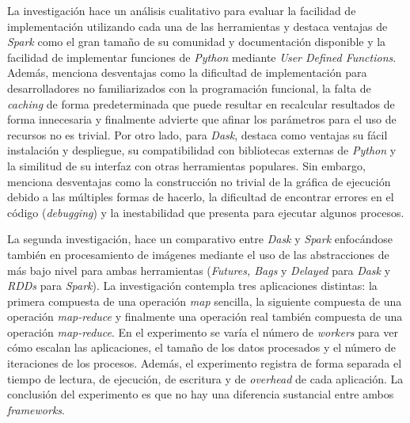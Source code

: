 La investigación hace un análisis cualitativo para evaluar la facilidad de implementación utilizando cada una de las herramientas y destaca ventajas de \textit{Spark} como el gran tamaño de su comunidad y documentación disponible y la facilidad de implementar funciones de \textit{Python} mediante \textit{User Defined Functions}. Además, menciona desventajas como la dificultad de implementación para desarrolladores no familiarizados con la programación funcional, la falta de \textit{caching} de forma predeterminada que puede resultar en recalcular resultados de forma innecesaria y finalmente advierte que afinar los parámetros para el uso de recursos no es trivial. Por otro lado, para \textit{Dask}, destaca como ventajas su fácil instalación y despliegue, su compatibilidad con bibliotecas externas de \textit{Python} y la similitud de su interfaz con otras herramientas populares. Sin embargo, menciona desventajas como la construcción no trivial de la gráfica de ejecución debido a las múltiples formas de hacerlo, la dificultad de encontrar errores en el código (\textit{debugging}) y la inestabilidad que presenta para ejecutar algunos procesos.

La segunda investigación, \cite{dask-spark-neuroimaging} hace un comparativo entre \textit{Dask} y \textit{Spark} enfocándose también en procesamiento de imágenes mediante el uso de las abstracciones de más bajo nivel para ambas herramientas (\textit{Futures, Bags} y \textit{Delayed} para \textit{Dask} y \textit{RDDs} para \textit{Spark}). La investigación contempla tres aplicaciones distintas: la primera compuesta de una operación \textit{map} sencilla, la siguiente compuesta de una operación \textit{map-reduce} y finalmente una operación real también compuesta de una operación \textit{map-reduce}. En el experimento se varía el número de \textit{workers} para ver cómo escalan las aplicaciones, el tamaño de los datos procesados y el número de iteraciones de los procesos. Además, el experimento registra de forma separada el tiempo de lectura, de ejecución, de escritura y de \textit{overhead} de cada aplicación. La conclusión del experimento es que no hay una diferencia sustancial entre ambos \textit{frameworks}.

